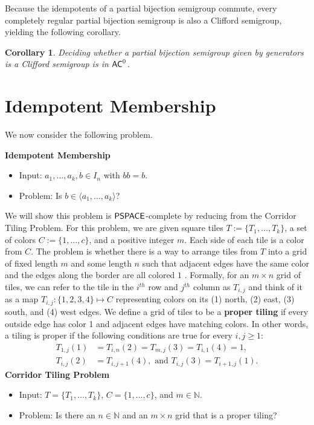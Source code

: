 \documentclass{amsart}
\newcommand{\PSPACE}{\ensuremath\mathsf{PSPACE}}
\newcommand{\AC}{\ensuremath\mathsf{AC}}
\newtheorem{corollary}[theorem]{Corollary}
\theoremstyle{remark}
\numberwithin{equation}{section}
\begin{document}
Because the idempotents of a partial bijection semigroup commute, every completely regular partial bijection semigroup is also a Clifford semigroup, yielding the following corollary.

\begin{corollary}
Deciding whether a partial bijection semigroup given by generators is a Clifford semigroup is in $\AC^0$.
\end{corollary}

\section{Idempotent Membership}
We now consider the following problem.

\medskip
{\bf Idempotent Membership}
\begin{itemize}
\item Input: $a_1,\dots,a_k, b \in I_n$ with $bb=b$.
\item Problem: Is $b \in \langle a_1,\dots,a_k \rangle$?
\end{itemize}

We will show this problem is $\PSPACE$-complete by reducing from the Corridor Tiling Problem. For this problem, we are given square tiles $T := \{T_1,\dots,T_k\}$, a set of colors $C := \{1,\dots,c\}$, and a positive integer $m$. Each side of each tile is a color from $C$. The problem is whether there is a way to arrange tiles from  $T$ into a grid of fixed length $m$ and some length $n$ such that adjacent edges have the same color and the edges along the border are all colored $1$ \cite{CHL:DTG}. Formally, for an $m \times n$ grid of tiles, we can refer to the tile in the $i^{th}$ row and $j^{th}$ column as $T_{i,j}$ and think of it as a map $T_{i,j}: \{1,2,3,4\} \mapsto C$ representing colors on its (1) north, (2) east, (3) south, and (4) west edges. We define a grid of tiles to be a {\bf proper tiling} if every outside edge has color 1 and adjacent edges have matching colors. In other words, a tiling is proper if the following conditions are true for every $i,j \geq 1$:
\begin{align*}
T_{1,j}(1) &= T_{i,n}(2) = T_{m,j}(3) = T_{i,1}(4) = 1,\\
T_{i,j}(2) &= T_{i,j+1}(4),\text{ and } T_{i,j}(3) = T_{i+1,j}(1).
\end{align*}
\medskip
{\bf Corridor Tiling Problem}
\begin{itemize}
\item Input: $T = \{T_1,\dots,T_k\}$, $C = \{1,\dots,c\}$, and $m \in \mathbb{N}$.
\item Problem: Is there an $n \in \mathbb{N}$ and an $m \times n$ grid that is a proper tiling?
\end{itemize}
\end{document}

